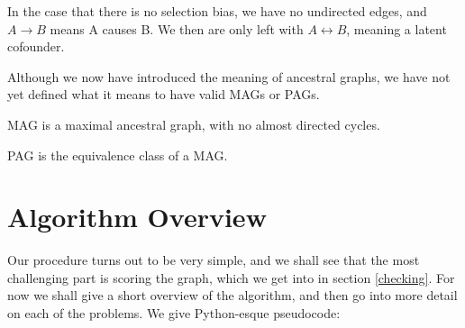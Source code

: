 \documentclass[11pt,a4paper]{report}
\theoremstyle{definition}
\begin{document}
In the case that there is no selection bias, we have no undirected edges,
and $A \rightarrow B$ means A causes B. We then are only left with $A
\leftrightarrow B$, meaning a latent cofounder.

Although we now have introduced the meaning of ancestral graphs, we have
not yet defined what it means to have valid MAGs or PAGs.

MAG is a maximal ancestral graph, with no almost directed cycles.

PAG is the equivalence class of a MAG.

\chapter{Algorithm Overview}\label{algorithm}
Our procedure turns out to be very simple, and we shall see that the most
challenging part is scoring the graph, which we get into in section
\ref{checking}. For now we shall give a short overview of the algorithm,
and then go into more detail on each of the problems. We give Python-esque
pseudocode:
\end{document}
